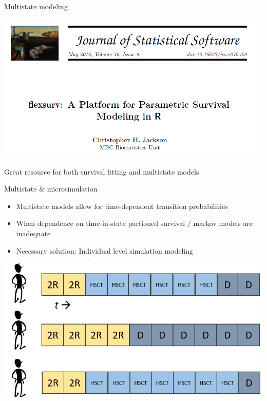 \documentclass[
  ignorenonframetext,
]{beamer}
\providecommand{\tightlist}{%
  \setlength{\itemsep}{0pt}\setlength{\parskip}{0pt}}
\begin{document}
\begin{frame}{Multistate modeling}
\protect\hypertarget{multistate-modeling-4}{}

\includegraphics[width=1\linewidth]{figures/jacksonflex}

Great resource for both survival fitting and multistate models

\end{frame}

\begin{frame}{Multistate \& microsimulation}
\protect\hypertarget{multistate-microsimulation}{}

\begin{itemize}
\tightlist
\item
  Multistate models allow for time-dependent transition probabilities
\item
  When dependence on time-in-state partioned survival / markov models
  are inadequate\\
\item
  Necessary solution: Individual level simulation modeling
\end{itemize}

\includegraphics[width=1\linewidth]{figures/microsim}

\end{frame}
\end{document}
